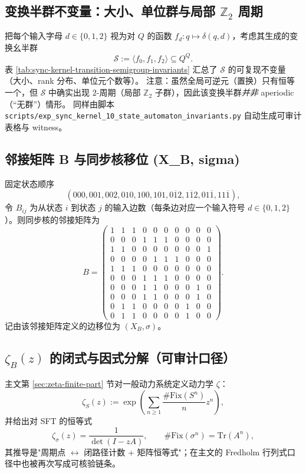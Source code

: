 \subsection{变换半群不变量：大小、单位群与局部 \texorpdfstring{$\mathbb{Z}_2$}{Z2} 周期}\label{app:sync-kernel-semigroup}
把每个输入字母 $d\in\{0,1,2\}$ 视为对 $Q$ 的函数 $f_d:q\mapsto\delta(q,d)$，考虑其生成的变换幺半群
\[
\mathcal{S}:=\langle f_0,f_1,f_2\rangle\subseteq Q^Q.
\]
表 \ref{tab:sync-kernel-transition-semigroup-invariants} 汇总了 $\mathcal{S}$ 的可复现不变量（大小、rank 分布、单位元个数等）。
注意：虽然全局可逆元（置换）只有恒等一个，但 $\mathcal{S}$ 中确实出现 $2$-周期（局部 $\mathbb{Z}_2$ 子群），因此该变换半群\emph{并非} aperiodic（“无群”）情形。
同样由脚本 \texttt{scripts/exp\_sync\_kernel\_10\_state\_automaton\_invariants.py} 自动生成可审计表格与 witness。



\subsection{邻接矩阵 B 与同步核移位 (X\_B, sigma)}\label{app:sync-kernel-basic}
固定状态顺序
\[
(000,001,002,010,100,101,0\overline{1}2,1\overline{1}2,01\overline{1},11\overline{1}),
\]
令 $B_{ij}$ 为从状态 $i$ 到状态 $j$ 的输入边数（每条边对应一个输入符号 $d\in\{0,1,2\}$）。则同步核的邻接矩阵为
\[
B=
\begin{pmatrix}
1&1&1&0&0&0&0&0&0&0\\
0&0&0&1&1&1&0&0&0&0\\
1&1&0&0&0&0&0&0&0&1\\
0&0&0&0&1&1&1&0&0&0\\
1&1&1&0&0&0&0&0&0&0\\
0&0&0&1&1&1&0&0&0&0\\
0&0&0&1&1&0&0&0&1&0\\
0&0&0&1&1&0&0&0&1&0\\
0&1&1&0&0&0&0&1&0&0\\
0&1&1&0&0&0&0&1&0&0
\end{pmatrix}.
\]
记由该邻接矩阵定义的边移位为 $(X_B,\sigma)$。

\subsection{\texorpdfstring{$\zeta_B(z)$}{zeta\_B(z)} 的闭式与因式分解（可审计口径）}
主文第 \ref{sec:zeta-finite-part} 节对一般动力系统定义动力学 $\zeta$：
\[
\zeta_S(z):=\exp\!\left(\sum_{n\ge 1}\frac{\#\mathrm{Fix}(S^n)}{n}z^n\right),
\]
并给出对 SFT 的恒等式
\[
\zeta_\sigma(z)=\frac{1}{\det(I-zA)},\qquad
\#\mathrm{Fix}(\sigma^n)=\mathrm{Tr}(A^n),
\]
其推导是"周期点 $\leftrightarrow$ 闭路径计数 + 矩阵恒等式"；在主文的 Fredholm 行列式口径中也被再次写成可核验链条。

